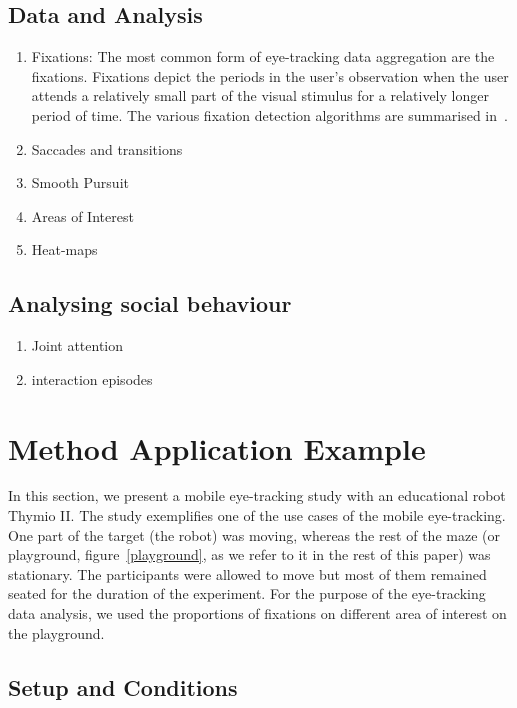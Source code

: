 \documentclass{sig-alternate}
\begin{document}
\subsection{Data and Analysis}

\begin{enumerate}
\item Fixations: The most common form of eye-tracking data aggregation are the fixations.
Fixations depict the periods in the user's observation when the user
attends a relatively small part of the visual stimulus for a relatively
longer period of time. The various fixation detection algorithms are
summarised in~\cite{duchowski2007eye}. 

\item Saccades and transitions
\item Smooth Pursuit
\item Areas of Interest
\item Heat-maps

\end {enumerate}


\subsection{Analysing social behaviour}

\begin{enumerate}
\item Joint attention
\item interaction episodes
\end{enumerate}


\section{Method Application Example}
In this section, we present a mobile eye-tracking study with an educational robot Thymio II. The study exemplifies one of the use cases of the mobile eye-tracking. One part of the target (the robot) was moving, whereas the rest of the maze (or playground, figure~\ref{playground}, as we refer to it in the rest of this paper) was stationary. The participants were allowed to move but most of them remained seated for the duration of the experiment. For the purpose of the eye-tracking data analysis, we used the proportions of fixations on different  area of interest on the playground.

\subsection{Setup and Conditions}
\end{document}

